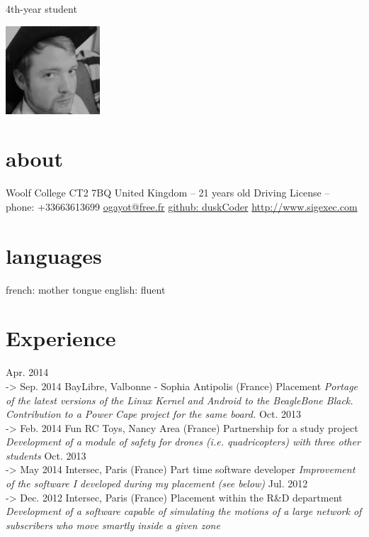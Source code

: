\documentclass[]{friggeri-cv}
\begin{document}
       {4th-year student}


\begin{aside}
    \includegraphics[width=100pt]{photo.png}
  \section{about}
    Woolf College
    CT2 7BQ
    United Kingdom
    --
    21 years old
    Driving License
    --
    ~
    phone: +33663613699
    \href{mailto:ogayot@free.fr}{ogayot@free.fr}
    \href{https://github.com/duskCoder}{github: duskCoder}
    \href{http://www.sigexec.com}{http://www.sigexec.com}
  \section{languages}
    french: mother tongue
    english: fluent
\end{aside}

\section{Experience}

\begin{entrylist}
  \entry
    {Apr. 2014 \\-> Sep. 2014}
    {BayLibre, Valbonne - Sophia Antipolis (France)}
    {Placement}
    {\emph{Portage of the latest versions of the Linux Kernel and Android to the BeagleBone Black. Contribution to a Power Cape project for the same board.}}
  \entry
    {Oct. 2013 \\-> Feb. 2014}
    {Fun RC Toys, Nancy Area (France)}
    {Partnership for a study project}
    {\emph{Development of a module of safety for drones (i.e. quadricopters) with three other students}}
  \entry
    {Oct. 2013 \\-> May 2014}
    {Intersec, Paris (France)}
    {Part time software developer}
    {\emph{Improvement of the software I developed during my placement (see below)}}
  \entry
    {Jul. 2012 \\-> Dec. 2012}
    {Intersec, Paris (France)}
    {Placement within the R\&D department}
    {\emph{Development of a software capable of simulating the motions of a large network of subscribers who move smartly inside a given zone}}
\end{entrylist}
\end{document}
